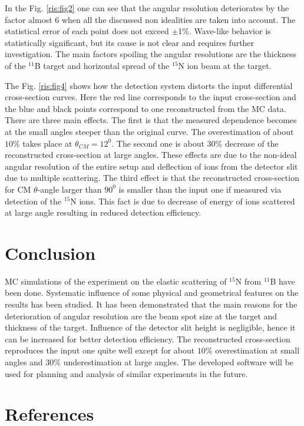 \documentclass[%
 aip,
cp,  %
 amsmath,amssymb,%
 reprint,%
]{revtex4-2}
\begin{document}
In the Fig. \ref{ris:fig2} one can see that the angular resolution deteriorates by the factor almost 6 when all the discussed non idealities are taken into account. The statistical error of each point does not exceed $\pm$1$\%$. Wave-like behavior is statistically significant, but its cause is not clear and requires further investigation. The main factors spoiling the angular resolutions are the thickness of the ${}^{11}$B target and horizontal spread of the ${}^{15}$N ion beam at the target.

The Fig. \ref{ris:fig4} shows how the detection system distorts the
input differential cross-section curves. Here the red line corresponds
to the input cross-section and the blue and black points correspond to
one reconstructed from the MC data. There are three main effects. The
first is that the measured dependence becomes at the small
angles steeper than the original curve. The overestimation of about $10\%$ takes place at $\theta_{CM} = 12^0$. The second one is about $30\%$ decrease of the
reconstructed cross-section at large angles. These effects are due to the
non-ideal angular resolution of the entire setup and deflection of ions from the detector slit due to multiple scattering. The third effect is
that the reconstructed cross-section for CM $\theta$-angle larger than
$90^0$ is smaller than the input one if measured via detection of the
${}^{15}$N ions.
This fact is due to decrease of energy of ions scattered at large angle
resulting in reduced detection efficiency.

\section{Conclusion}

MC simulations of the experiment on the elastic scattering of ${}^{15}$N  from ${}^{11}$B have been done. Systematic influence of some physical and geometrical features on the results has been studied. It has been demonstrated that the main reasons for the deterioration of angular resolution are the beam spot size at the target and thickness of the target. Influence of the detector slit height is negligible, hence it can be increased for better detection efficiency. The reconstructed cross-section reproduces the input one quite well except for about $10\%$ overestimation at small angles and $30\%$ underestimation at large angles. The developed software will be used for planning and analysis of similar experiments in the future.

\section{References}
\end{document}

